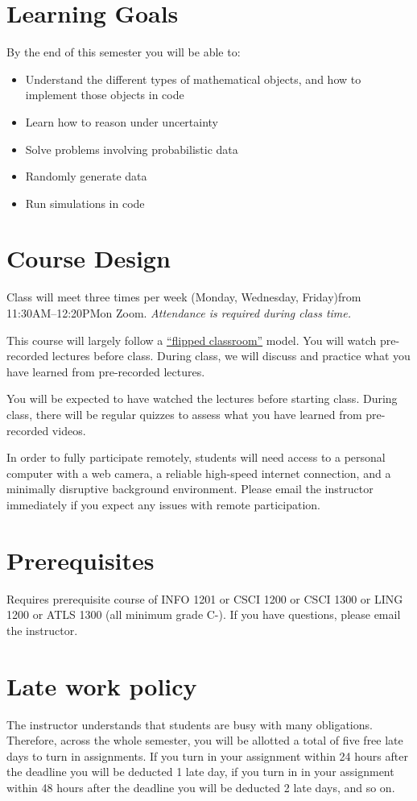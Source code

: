 \documentclass[10pt]{memoir}
\def\mymeetingdays{Monday, Wednesday, Friday}
\def\mymeetingtimes{11:30AM--12:20PM}
\begin{document}
\section{Learning Goals}

By the end of this semester you will be able to:
\begin{itemize}
\item Understand the different types of mathematical objects, and how to implement those objects in code
\item Learn how to reason under uncertainty
\item Solve problems involving probabilistic data
\item Randomly generate data 
\item Run simulations in code
\end{itemize}

\section{Course Design}
Class will meet three times per week (\mymeetingdays)\space from \mymeetingtimes\space on Zoom. \textit{Attendance is required during class time.} 

This course will largely follow a \href{https://en.wikipedia.org/wiki/Flipped_classroom}{``flipped classroom''}  model. You will watch pre-recorded lectures before class. During class, we will discuss and practice what you have learned from pre-recorded lectures. 

You will be expected to have watched the lectures before starting class. During class, there will be regular quizzes to assess what you have learned from pre-recorded videos. 

In order to fully participate remotely, students will need access to a personal computer with a web camera, a reliable high-speed internet connection, and a minimally disruptive background environment. Please email the instructor immediately if you expect any issues with remote participation.

\section{Prerequisites}

Requires prerequisite course of INFO 1201 or CSCI 1200 or CSCI 1300 or LING 1200 or ATLS 1300 (all minimum grade C-). If you have questions, please email the instructor.

\section{Late work policy}
The instructor understands that students are busy with many obligations. Therefore, across the whole semester, you will be allotted a total of five free late days to turn in assignments. If you turn in your assignment within 24 hours after the deadline you will be deducted 1 late day, if you turn in in your assignment within 48 hours after the deadline you will be deducted 2 late days, and so on. 
\end{document}
